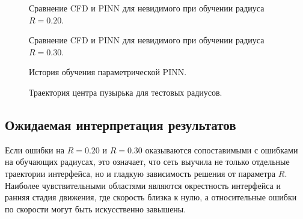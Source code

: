 \documentclass[12pt,a4paper]{article}
\begin{document}
\begin{figure}[h]
    \centering
    \caption{Сравнение CFD и PINN для невидимого при обучении радиуса \(R=0.20\).}
    \label{fig:r020_comparison}
\end{figure}

\begin{figure}[h]
    \centering
    \caption{Сравнение CFD и PINN для невидимого при обучении радиуса \(R=0.30\).}
    \label{fig:r030_comparison}
\end{figure}

\begin{figure}[h]
    \centering
    \caption{История обучения параметрической PINN.}
    \label{fig:loss_history}
\end{figure}

\begin{figure}[h]
    \centering
    \caption{Траектория центра пузырька для тестовых радиусов.}
    \label{fig:center_of_mass}
\end{figure}

\subsection{Ожидаемая интерпретация результатов}

Если ошибки на \(R=0.20\) и \(R=0.30\) оказываются сопоставимыми с ошибками на
обучающих радиусах, это означает, что сеть выучила не только отдельные
траектории интерфейса, но и гладкую зависимость решения от параметра \(R\).
Наиболее чувствительными областями являются окрестность интерфейса и ранняя
стадия движения, где скорость близка к нулю, а относительные ошибки по скорости
могут быть искусственно завышены.
\end{document}

